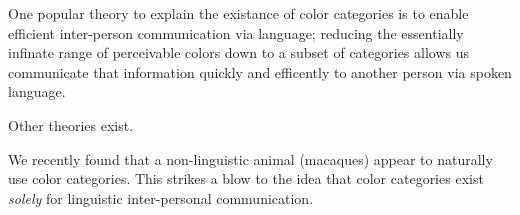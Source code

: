 One popular theory to explain the existance of color categories is to enable efficient inter-person communication via language; reducing the essentially infinate range of perceivable colors down to a subset of categories allows us communicate that information quickly and efficently to another person via spoken language.

Other theories exist.

We recently found that a non-linguistic animal (macaques) appear to naturally use color categories. This strikes a blow to the idea that color categories exist \emph{solely} for linguistic inter-personal communication.